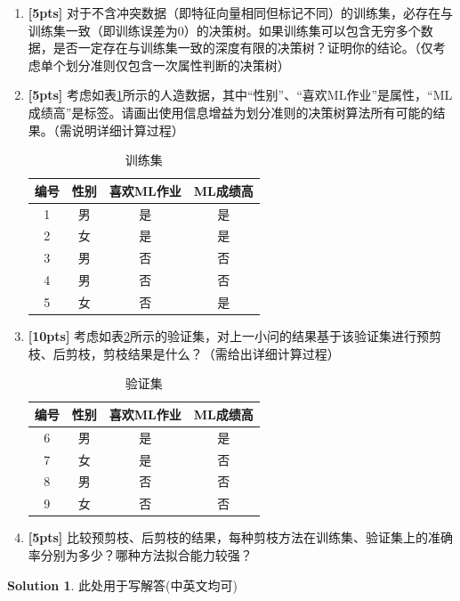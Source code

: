 \documentclass[a4paper,UTF8]{article}
\theoremstyle{definition}
\newtheorem*{solution}{Solution}
\begin{document}
\begin{enumerate}[(1)]
	\item \textbf{[5pts]} 对于不含冲突数据（即特征向量相同但标记不同）的训练集，必存在与训练集一致（即训练误差为$0$）的决策树。如果训练集可以包含无穷多个数据，是否一定存在与训练集一致的深度有限的决策树？证明你的结论。（仅考虑单个划分准则仅包含一次属性判断的决策树）
	\item \textbf{[5pts]} 考虑如表\ref{train data for tree}所示的人造数据，其中“性别”、“喜欢ML作业”是属性，“ML成绩高”是标签。请画出使用信息增益为划分准则的决策树算法所有可能的结果。（需说明详细计算过程）
	\begin{table}[h]
		\caption{训练集}
		\label{train data for tree}
		\centering
		\begin{tabular}{cccc}
			\hline 
			编号 & 性别 & 喜欢ML作业 & ML成绩高 \\ 
			\hline 
			1 & 男 & 是 & 是 \\ 
			2 & 女 & 是 & 是 \\ 
			3 & 男 & 否 & 否 \\ 
			4 & 男 & 否 & 否 \\ 
			5 & 女 & 否 & 是 \\ 
			\hline 
		\end{tabular}
	\end{table}
	\item \textbf{[10pts]} 考虑如表\ref{validation data for tree}所示的验证集，对上一小问的结果基于该验证集进行预剪枝、后剪枝，剪枝结果是什么？（需给出详细计算过程）
	\begin{table}[h]
		\caption{验证集}
		\label{validation data for tree}
		\centering
		\begin{tabular}{cccc}
			\hline 
			编号 & 性别 & 喜欢ML作业 & ML成绩高 \\ 
			\hline 
			6 & 男 & 是 & 是 \\ 
			7 & 女 & 是 & 否 \\ 
			8 & 男 & 否 & 否 \\ 
			9 & 女 & 否 & 否 \\ 
			\hline 
		\end{tabular}
	\end{table}
	\item \textbf{[5pts]} 比较预剪枝、后剪枝的结果，每种剪枝方法在训练集、验证集上的准确率分别为多少？哪种方法拟合能力较强？
\end{enumerate}

\begin{solution}
	此处用于写解答(中英文均可)

\end{solution}
\end{document}
